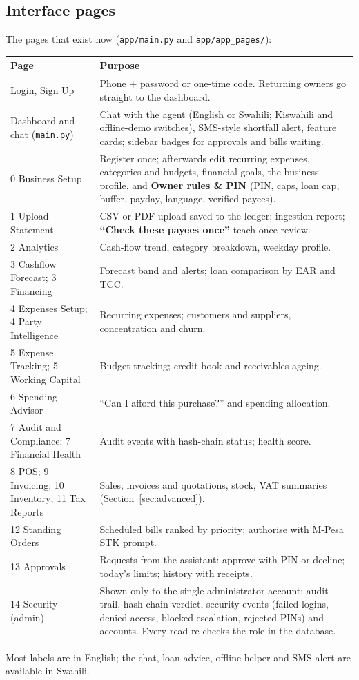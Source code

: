 \documentclass[10pt,a4paper]{article}
\newcommand{\code}[1]{\texttt{\small #1}}
\begin{document}
\subsection{Interface pages}
The pages that exist now (\code{app/main.py} and \code{app/app\_pages/}):
\begingroup\footnotesize
\begin{longtable}{@{}p{3.6cm}p{11.4cm}@{}}
\toprule
\textbf{Page} & \textbf{Purpose}\\
\midrule\endhead
Login, Sign Up & Phone + password or one-time code. Returning owners go straight to the dashboard.\\
Dashboard and chat (\code{main.py}) & Chat with the agent (English or Swahili; Kiswahili and offline-demo switches), SMS-style shortfall alert, feature cards; sidebar badges for approvals and bills waiting.\\
0 Business Setup & Register once; afterwards edit recurring expenses, categories and budgets, financial goals, the business profile, and \textbf{Owner rules \& PIN} (PIN, caps, loan cap, buffer, payday, language, verified payees).\\
1 Upload Statement & CSV or PDF upload saved to the ledger; ingestion report; \textbf{``Check these payees once''} teach-once review.\\
2 Analytics & Cash-flow trend, category breakdown, weekday profile.\\
3 Cashflow Forecast; 3 Financing & Forecast band and alerts; loan comparison by EAR and TCC.\\
4 Expenses Setup; 4 Party Intelligence & Recurring expenses; customers and suppliers, concentration and churn.\\
5 Expense Tracking; 5 Working Capital & Budget tracking; credit book and receivables ageing.\\
6 Spending Advisor & ``Can I afford this purchase?'' and spending allocation.\\
7 Audit and Compliance; 7 Financial Health & Audit events with hash-chain status; health score.\\
8 POS; 9 Invoicing; 10 Inventory; 11 Tax Reports & Sales, invoices and quotations, stock, VAT summaries (Section~\ref{sec:advanced}).\\
12 Standing Orders & Scheduled bills ranked by priority; authorise with M-Pesa STK prompt.\\
13 Approvals & Requests from the assistant: approve with PIN or decline; today's limits; history with receipts.\\
14 Security (admin) & Shown only to the single administrator account: audit trail, hash-chain verdict, security events (failed logins, denied access, blocked escalation, rejected PINs) and accounts. Every read re-checks the role in the database.\\
\bottomrule
\end{longtable}
\endgroup
Most labels are in English; the chat, loan advice, offline helper and SMS alert are available in Swahili.
\end{document}
